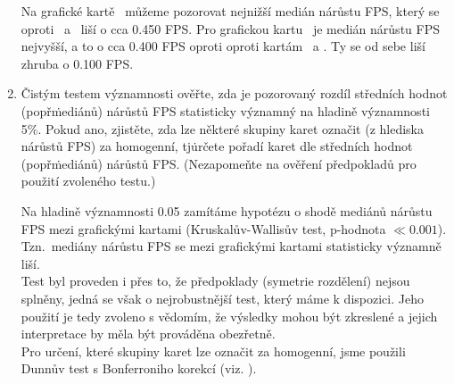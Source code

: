 \begin{enumerate}[label=\alph*)]
\begin{minipage}{0.94\textwidth}
        Na grafické kartě \amdCardSest\ můžeme pozorovat nejnižší medián nárůstu FPS, který se oproti \nvidiaCardDva\ a \amdCardSedm\ liší o cca 0.450 FPS.\@
        Pro grafickou kartu \nvidiaCardTri\ je medián nárůstu FPS nejvyšší, a to o cca 0.400 FPS oproti oproti kartám \nvidiaCardDva\ a \amdCardSedm\!.
        Ty se od sebe liší zhruba o 0.100 FPS.\@
    \end{minipage}

    \newpage
    \item Čistým testem významnosti ověřte, zda je pozorovaný rozdíl středních hodnot (popř\. mediánů) nárůstů FPS statisticky
    významný na hladině významnosti 5\%.\@
    Pokud ano, zjistěte, zda lze některé skupiny karet označit (z hlediska nárůstů FPS) za homogenní, tj\. určete pořadí karet dle středních hodnot (popř\. mediánů) nárůstů FPS.\@
    (Nezapomeňte na ověření předpokladů pro použití zvoleného testu.) \\

    \begin{minipage}{0.94\textwidth}
        Na hladině významnosti 0.05 zamítáme hypotézu o shodě mediánů nárůstu FPS mezi grafickými kartami (Kruskalův-Wallisův test, p-hodnota $\ll 0.001$).
        Tzn.\ mediány nárůstu FPS se mezi grafickými kartami statisticky významně liší. \\

        Test byl proveden i přes to, že předpoklady (symetrie rozdělení) nejsou splněny, jedná se však o nejrobustnější test, který máme k dispozici.
        Jeho použití je tedy zvoleno s vědomím, že výsledky mohou být zkreslené a jejich interpretace by měla být prováděna obezřetně. \\

        Pro určení, které skupiny karet lze označit za homogenní, jsme použili Dunnův test s Bonferroniho korekcí (viz. ).

        \vspace{1em}
        \label{tab:post-hoc-test}
        \vspace{0.5em}
        \renewcommand{\arraystretch}{1.3}


\end{minipage}
\end{enumerate}
